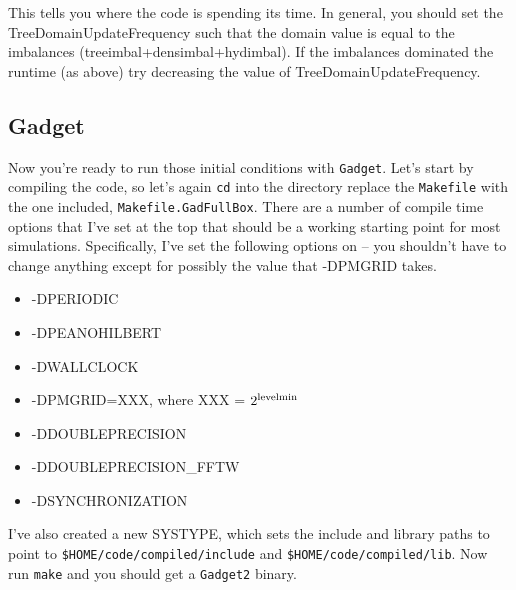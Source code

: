 \documentclass[10pt,a4paper,onecolumn]{article}
\begin{document}
This tells you where the code is spending its time. In general, you should set the TreeDomainUpdateFrequency such that the domain value is equal to the imbalances (treeimbal+densimbal+hydimbal). If the imbalances dominated the runtime (as above) try decreasing the value of TreeDomainUpdateFrequency.

\subsection{Gadget}
Now you're ready to run those initial conditions with \texttt{Gadget}.  Let's start by 
compiling the code, so let's again \texttt{cd} into the directory replace the
\texttt{Makefile} with the one included, \texttt{Makefile.GadFullBox}.  There 
are a number of compile time options that I've set at the top that should be a working 
starting point for most simulations.  Specifically, I've set the following options on -- 
you shouldn't have to change anything except for possibly the value 
that -DPMGRID takes.
\begin{itemize}
\item -DPERIODIC 
\item -DPEANOHILBERT
\item  -DWALLCLOCK
\item -DPMGRID=XXX, where XXX = $2^{\rm levelmin}$
\item -DDOUBLEPRECISION      
\item  -DDOUBLEPRECISION\_FFTW
\item -DSYNCHRONIZATION
\end{itemize}
I've also created a new SYSTYPE, which sets the include and library paths
to point to \texttt{\$HOME/code/compiled/include} and 
\texttt{\$HOME/code/compiled/lib}.  Now run \texttt{make} and you should 
get a \texttt{Gadget2} binary.
\end{document}
